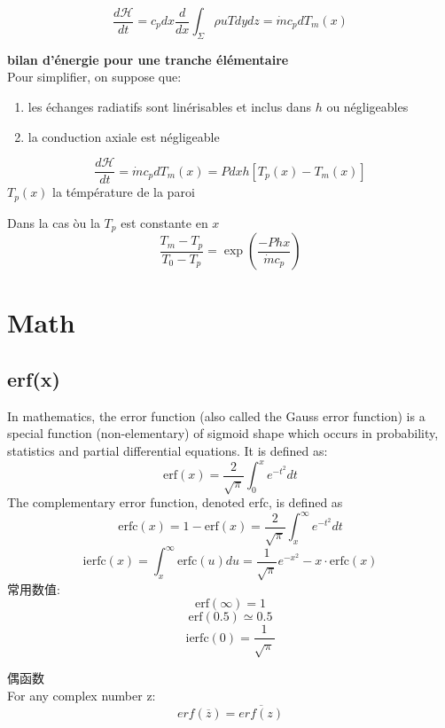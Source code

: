 \documentclass{article}
\begin{document}
\begin{equation}
\dfrac{d \mathcal{H}}{dt}
= c_p dx \dfrac{d}{dx}\int_\Sigma \rho u T dydz
= \dot{m} c_p dT_m(x)
\end{equation}

\textbf{bilan d'\'energie pour une tranche \'el\'ementaire}\\
Pour simplifier, on suppose que:
\begin{enumerate}
\item les \'echanges radiatifs sont lin\'erisables et inclus dans $h$ ou n\'egligeables
\item la conduction axiale est n\'egligeable
\end{enumerate}

\begin{equation}
\dfrac{d \mathcal{H}}{dt}
= \dot{m} c_p dT_m(x)
= P dx h [T_p(x) - T_m(x)]
\end{equation}
$T_p(x)$ la t\'emp\'erature de la paroi

Dans la cas \`ou la $T_p$ est constante en $x$
$$ \dfrac{T_m - T_p}{T_0 - T_p} = \exp(\dfrac{-Phx}{\dot{m} c_p}) $$

\section{Math}
\subsection{erf(x)}
In mathematics, the error function (also called the Gauss error function) is a special function (non-elementary) of sigmoid shape which occurs in probability, statistics and partial differential equations. It is defined as:
\begin{equation}
 \mbox{erf}(x)=\frac{2}{\sqrt{\pi}}\int_{0}^{x}e^{-t^2}dt
\end{equation}
The complementary error function, denoted erfc, is defined as
\begin{equation}
 \mbox{erfc}(x)=1-\mbox{erf}(x)=\frac{2}{\sqrt{\pi}}\int_{x}^{\infty }e^{-t^2}dt
\end{equation}
$$\mbox{ierfc}(x)=\int_x^{\infty}\mbox{erfc}(u)du=\frac{ 1}{\sqrt{\pi}}e^{-x^2} -  x \cdot \mbox{erfc}(x)$$
常用数值:
$$\mbox{erf}(\infty)=1$$
$$\mbox{erf}(0.5) \simeq 0.5$$
$$\mbox{ierfc}(0)=\frac{ 1}{\sqrt{\pi}}$$

偶函数\\
For any complex number z:
\begin{equation}
 erf(\overline{z})=\overline{erf(z)}
\end{equation}
\end{document}
